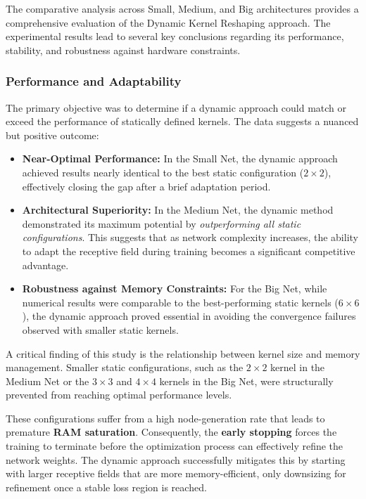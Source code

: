The comparative analysis across Small, Medium, and Big architectures provides a comprehensive evaluation of the Dynamic Kernel Reshaping approach. The experimental results lead to several key conclusions regarding its performance, stability, and robustness against hardware constraints.

\subsubsection{Performance and Adaptability}
The primary objective was to determine if a dynamic approach could match or exceed the performance of statically defined kernels. The data suggests a nuanced but positive outcome:
\begin{itemize}
    \item \textbf{Near-Optimal Performance:} In the Small Net, the dynamic approach achieved results nearly identical to the best static configuration ($2 \times 2$), effectively closing the gap after a brief adaptation period.
    \item \textbf{Architectural Superiority:} In the Medium Net, the dynamic method demonstrated its maximum potential by \textit{outperforming all static configurations}. This suggests that as network complexity increases, the ability to adapt the receptive field during training becomes a significant competitive advantage.
    \item \textbf{Robustness against Memory Constraints:} For the Big Net, while numerical results were comparable to the best-performing static kernels ($6 \times 6$), the dynamic approach proved essential in avoiding the convergence failures observed with smaller static kernels.
\end{itemize}

A critical finding of this study is the relationship between kernel size and memory management. Smaller static configurations, such as the $2 \times 2$ kernel in the Medium Net or the $3 \times 3$ and $4 \times 4$ kernels in the Big Net, were structurally prevented from reaching optimal performance levels. 

These configurations suffer from a high node-generation rate that leads to premature \textbf{RAM saturation}. Consequently, the \textbf{early stopping} forces the training to terminate before the optimization process can effectively refine the network weights. The dynamic approach successfully mitigates this by starting with larger receptive fields that are more memory-efficient, only downsizing for refinement once a stable loss region is reached.

